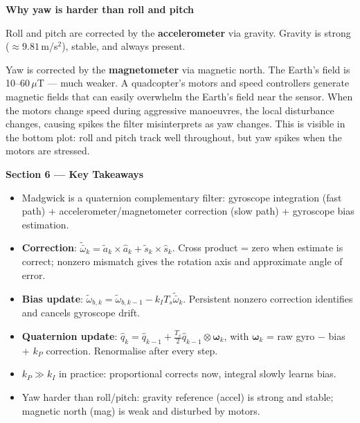 \documentclass[12pt, a4paper]{article}
\begin{document}
\begin{notebox}
  \textbf{Why yaw is harder than roll and pitch}

  Roll and pitch are corrected by the \textbf{accelerometer} via gravity.
  Gravity is strong ($\approx 9.81$\,m/s$^2$), stable, and always present.

  Yaw is corrected by the \textbf{magnetometer} via magnetic north.
  The Earth's field is 10--60\,$\mu$T --- much weaker.
  A quadcopter's motors and speed controllers generate magnetic fields that
  can easily overwhelm the Earth's field near the sensor.
  When the motors change speed during aggressive manoeuvres, the local
  disturbance changes, causing spikes the filter misinterprets as yaw
  changes.
  This is visible in the bottom plot: roll and pitch track well
  throughout, but yaw spikes when the motors are stressed.
\end{notebox}

\begin{keybox}
  \textbf{Section 6 --- Key Takeaways}
  \begin{itemize}[leftmargin=1.2em, itemsep=2pt]
    \item Madgwick is a quaternion complementary filter: gyroscope
      integration (fast path) + accelerometer/magnetometer correction
      (slow path) + gyroscope bias estimation.

    \item \textbf{Correction}: $\tilde{\bar{\omega}}_k =
      \tilde{a}_k\times\hat{a}_k + \tilde{s}_k\times\hat{s}_k$.
      Cross product = zero when estimate is correct; nonzero mismatch
      gives the rotation axis and approximate angle of error.

    \item \textbf{Bias update}: $\tilde{\omega}_{b,k} =
      \tilde{\omega}_{b,k-1} - k_I T_s\tilde{\bar{\omega}}_k$.
      Persistent nonzero correction identifies and cancels gyroscope drift.

    \item \textbf{Quaternion update}: $\hat{q}_k = \hat{q}_{k-1} +
      \tfrac{T_s}{2}\hat{q}_{k-1}\otimes\boldsymbol{\omega}_k$, with
      $\boldsymbol{\omega}_k$ = raw gyro $-$ bias $+$ $k_P$ correction.
      Renormalise after every step.

    \item $k_P \gg k_I$ in practice: proportional corrects now, integral
      slowly learns bias.

    \item Yaw harder than roll/pitch: gravity reference (accel) is strong
      and stable; magnetic north (mag) is weak and disturbed by motors.
  \end{itemize}
\end{keybox}
\end{document}
